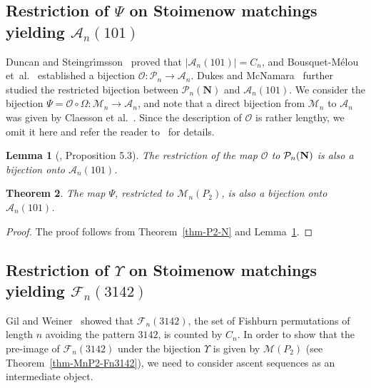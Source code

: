 \documentclass[11pt]{article}
\newcommand{\etal}{et~al.}
\newtheorem{thm}{Theorem}[section]
\newtheorem{lem}[thm]{Lemma}
\newcommand{\A}{\mathcal{A}}
\newcommand{\PP}{{\mathcal P}}
\newcommand{\F}{\mathcal{F}}
\newcommand{\M}{\mathcal{M}}
\begin{document}
	\subsection{Restriction of $\Psi$ on Stoimenow matchings yielding  $\A_n(101)$}\label{sec-matching-101}
	
	Duncan and Steingr\'{\i}msson~\cite{Duncan-Steingrimsson} proved that $|\A_n(101)|=C_n$, and  Bousquet-M\'elou \etal ~\cite{Bousquet-Claesson-Dukes-Kitaev}
	established a bijection $\mathcal{O}\colon\PP_n\to\A_n$. Dukes and McNamara~\cite{Dukes-McNamara} further studied the restricted bijection between $\PP_n(\mathbf{N})$ and $\A_n(101)$.
	We consider the bijection $\Psi=\mathcal{O} \circ \Omega: \mathcal{M}_n \to \mathcal{A}_n$, 
	and note that a direct bijection from $\mathcal{M}_n$ to $\mathcal{A}_n$ was given by Claesson et al.~\cite{Claesson-Dukes-Kitaev}. 
	Since the description of $\mathcal{O}$ is rather lengthy, we omit it here and refer the reader to~\cite{Bousquet-Claesson-Dukes-Kitaev} for details.
	
	\begin{lem}[\cite{Dukes-McNamara},  Proposition 5.3]\label{lem-cite-N-101}
		The restriction of the map $\mathcal{O}$ to $\PP_n{\bf{(N)}}$ is also a bijection onto $\A_n(101)$.
	\end{lem}
	
	\begin{thm}\label{thm-P2-101}
		The map $\Psi$, restricted to $\M_n(P_2)$, is also a bijection onto $\A_n(101)$.
	\end{thm}
	\begin{proof}
		The proof follows from Theorem~\ref{thm-P2-N} and Lemma~\ref{lem-cite-N-101}.
	\end{proof}
	
	\subsection{Restriction of $\Upsilon$ on Stoimenow matchings yielding  $\F_n(3142)$}\label{subsec-matching-perm}
	
	Gil and Weiner~\cite{Gil-Weiner} showed that $\F_n(3142)$, the set of Fishburn permutations of length $n$ avoiding the pattern $3142$, is counted by $C_n$. In order to show that the pre-image of $\F_n(3142)$ under the bijection $\Upsilon$ is given by $\M(P_2)$ (see Theorem~\ref{thm-MnP2-Fn3142}), we need to consider ascent sequences as an intermediate object.
	
\end{document}
